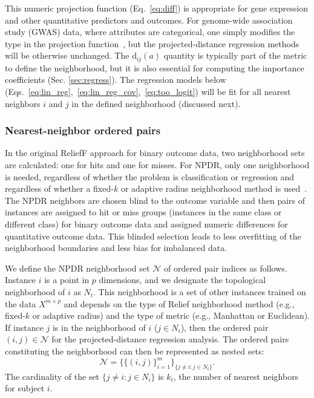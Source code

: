 \documentclass[10pt]{article}
\begin{document}
This numeric projection function (Eq.~\ref{eq:diff}) is appropriate for gene expression and other quantitative predictors and outcomes. For genome-wide association study (GWAS) data, where attributes are categorical, one simply modifies the type in the projection function~\cite{titv}, but the projected-distance regression methods will be otherwise unchanged. The $\text{d}_{ij}(a)$ quantity is typically part of the metric to define the neighborhood, but it is also essential for computing the importance coefficients (Sec. \ref{sec:regress}).  The regression models below (Eqs.~\ref{eq:lin_reg},~\ref{eq:lin_reg_cov},~\ref{eq:too_logit}) will be fit for all nearest neighbors $i$ and $j$ in the defined neighborhood (discussed next). 

\subsubsection{Nearest-neighbor ordered pairs}
In the original ReliefF approach for binary outcome data, two neighborhood sets are calculated: one for hits and one for misses.
For NPDR, only one neighborhood is needed, regardless of whether the problem is classification or regression and regardless of whether a fixed-$k$ or adaptive radius neighborhood method is used~\cite{greene09,urbanowicz17,mckinney13}. The NPDR neighbors are chosen blind to the outcome variable and then pairs of instances are assigned to hit or miss groups (instances in the same class or different class) for binary outcome data and assigned numeric differences for quantitative outcome data. This blinded selection leads to less overfitting of the neighborhood boundaries and less bias for imbalanced data.     

We define the NPDR neighborhood set $\mathcal{N}$ of ordered pair indices as follows. Instance $i$ is a point in $p$ dimensions, and we designate the topological neighborhood of $i$ as $N_{i}$. This neighborhood is a set of other instances trained on the data $X^{m \times p}$ and depends on the type of Relief neighborhood method (e.g., fixed-$k$ or adaptive radius) and the type of metric (e.g., Manhattan or Euclidean). If instance $j$ is in the neighborhood of $i$ ($j \in N_{i}$), then the ordered pair $(i,j) \in \mathcal{N}$ for the projected-distance regression analysis. The ordered pairs constituting the neighborhood can then be represented as nested sets:
\begin{equation}\label{eq:N}
\mathcal{N}=\{\{(i, j)\}_{i=1}^{m}\}_{\{j \ne i : j \in N_{i}\}}.
\end{equation}
The cardinality of the set $\{j \ne i : j \in N_{i}\}$ is $k_i$, the number of nearest neighbors for subject $i$. 
\end{document}
